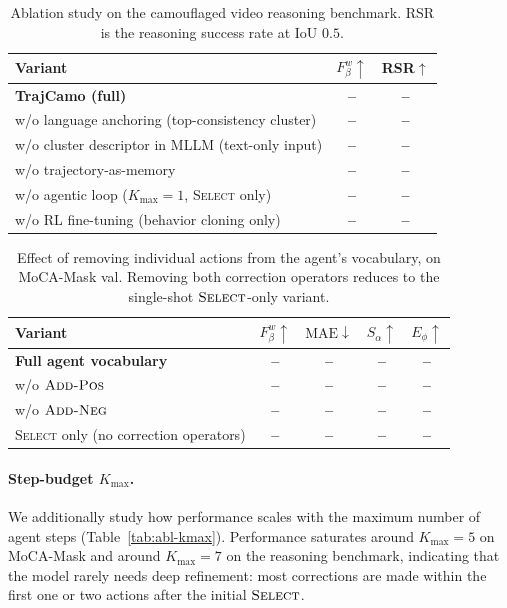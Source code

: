 \documentclass[11pt]{article}
\newcommand{\TBD}{\textcolor{red!70!black}{\textbf{--}}}
\begin{document}
\begin{table}[t]
\centering
\caption{Ablation study on the camouflaged video reasoning benchmark. RSR is the reasoning success rate at IoU $0.5$.}
\label{tab:abl-reason}
\small
\begin{tabular}{lcc}
\toprule
Variant & $F^w_\beta\uparrow$ & RSR$\uparrow$ \\
\midrule
\textbf{TrajCamo (full)}                              & \TBD & \TBD \\
\;\;w/o language anchoring (top-consistency cluster)  & \TBD & \TBD \\
\;\;w/o cluster descriptor in MLLM (text-only input)  & \TBD & \TBD \\
\;\;w/o trajectory-as-memory                          & \TBD & \TBD \\
\;\;w/o agentic loop ($K_{\max}{=}1$, \textsc{Select} only)  & \TBD & \TBD \\
\;\;w/o RL fine-tuning (behavior cloning only)        & \TBD & \TBD \\
\bottomrule
\end{tabular}
\end{table}

\begin{table}[t]
\centering
\caption{Effect of removing individual actions from the agent's vocabulary, on MoCA-Mask val. Removing both correction operators reduces to the single-shot $\textsc{Select}$-only variant.}
\label{tab:abl-action}
\small
\begin{tabular}{lcccc}
\toprule
Variant & $F^w_\beta\uparrow$ & $\mathrm{MAE}\downarrow$ & $S_\alpha\uparrow$ & $E_\phi\uparrow$ \\
\midrule
\textbf{Full agent vocabulary}                        & \TBD & \TBD & \TBD & \TBD \\
\;\;w/o $\textsc{Add-Pos}$                            & \TBD & \TBD & \TBD & \TBD \\
\;\;w/o $\textsc{Add-Neg}$                            & \TBD & \TBD & \TBD & \TBD \\
\;\;\textsc{Select} only (no correction operators)    & \TBD & \TBD & \TBD & \TBD \\
\bottomrule
\end{tabular}
\end{table}

\paragraph{Step-budget $K_{\max}$.}
We additionally study how performance scales with the maximum number of agent steps (Table~\ref{tab:abl-kmax}).
Performance saturates around $K_{\max}=5$ on MoCA-Mask and around $K_{\max}=7$ on the reasoning benchmark, indicating that the model rarely needs deep refinement: most corrections are made within the first one or two actions after the initial $\textsc{Select}$.
\end{document}
